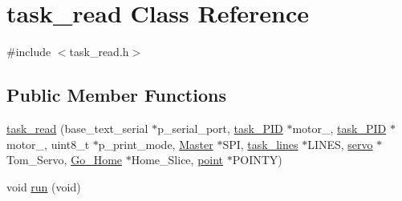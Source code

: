\hypertarget{classtask__read}{\section{task\-\_\-read Class Reference}
\label{classtask__read}
}


{\ttfamily \#include $<$task\-\_\-read.\-h$>$}

\subsection*{Public Member Functions}
\begin{DoxyCompactItemize}
\item 
\hyperlink{classtask__read_a6e7da4895a28c1cbb2572364a15fdaff}{task\-\_\-read} (base\-\_\-text\-\_\-serial $\ast$p\-\_\-serial\-\_\-port, \hyperlink{classtask__PID}{task\-\_\-\-P\-I\-D} $\ast$motor\-\_, \hyperlink{classtask__PID}{task\-\_\-\-P\-I\-D} $\ast$motor\-\_, uint8\-\_\-t $\ast$p\-\_\-print\-\_\-mode, \hyperlink{classMaster}{Master} $\ast$S\-P\-I, \hyperlink{classtask__lines}{task\-\_\-lines} $\ast$L\-I\-N\-E\-S, \hyperlink{classservo}{servo} $\ast$Tom\-\_\-\-Servo, \hyperlink{classGo__Home}{Go\-\_\-\-Home} $\ast$Home\-\_\-\-Slice, \hyperlink{classpoint}{point} $\ast$P\-O\-I\-N\-T\-Y)
\item 
void \hyperlink{classtask__read_af2face98d4feb25a296ab079706d41fd}{run} (void)
\end{DoxyCompactItemize}
